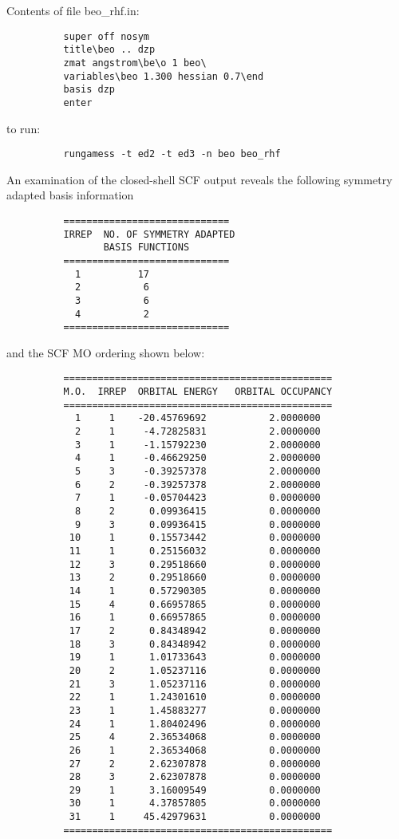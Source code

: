 \documentclass[11pt,fleqn]{article}
\begin{document}
Contents of file beo\_rhf.in:
{
\footnotesize
\begin{verbatim}
          super off nosym
          title\beo .. dzp
          zmat angstrom\be\o 1 beo\
          variables\beo 1.300 hessian 0.7\end
          basis dzp
          enter
\end{verbatim}
}
to run:
{
\footnotesize
\begin{verbatim}
          rungamess -t ed2 -t ed3 -n beo beo_rhf
\end{verbatim}
}
An examination of the closed-shell SCF output reveals the
following symmetry adapted basis information
{
\footnotesize
\begin{verbatim}
          =============================
          IRREP  NO. OF SYMMETRY ADAPTED
                 BASIS FUNCTIONS
          =============================
            1          17
            2           6
            3           6
            4           2
          =============================
\end{verbatim}
}
and the SCF MO ordering shown below:
{
\footnotesize
\begin{verbatim}
          ===============================================
          M.O.  IRREP  ORBITAL ENERGY   ORBITAL OCCUPANCY
          ===============================================
            1     1    -20.45769692           2.0000000
            2     1     -4.72825831           2.0000000
            3     1     -1.15792230           2.0000000
            4     1     -0.46629250           2.0000000
            5     3     -0.39257378           2.0000000
            6     2     -0.39257378           2.0000000
            7     1     -0.05704423           0.0000000
            8     2      0.09936415           0.0000000
            9     3      0.09936415           0.0000000
           10     1      0.15573442           0.0000000
           11     1      0.25156032           0.0000000
           12     3      0.29518660           0.0000000
           13     2      0.29518660           0.0000000
           14     1      0.57290305           0.0000000
           15     4      0.66957865           0.0000000
           16     1      0.66957865           0.0000000
           17     2      0.84348942           0.0000000
           18     3      0.84348942           0.0000000
           19     1      1.01733643           0.0000000
           20     2      1.05237116           0.0000000
           21     3      1.05237116           0.0000000
           22     1      1.24301610           0.0000000
           23     1      1.45883277           0.0000000
           24     1      1.80402496           0.0000000
           25     4      2.36534068           0.0000000
           26     1      2.36534068           0.0000000
           27     2      2.62307878           0.0000000
           28     3      2.62307878           0.0000000
           29     1      3.16009549           0.0000000
           30     1      4.37857805           0.0000000
           31     1     45.42979631           0.0000000
          ===============================================
\end{verbatim}
}
\end{document}
